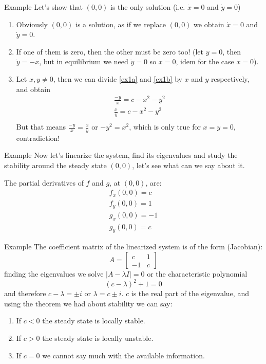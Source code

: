 \documentclass[aspectratio=169]{beamer}
\begin{document}
\begin{frame}{Example}
    Let's show that $(0,0)$ is the only solution (i.e. $\dot{x}=0$ and $\dot{y}=0$)
    \begin{enumerate}
        \item Obviously $(0,0)$ is a solution, as if we replace $(0,0)$ we obtain $\dot{x}=0$ and $\dot{y}=0$.
        \item If one of them is zero, then the other must be zero too! (let $y=0$, then $\dot{y}=-x$, but in equilibrium we need $\dot{y}=0$ so $x=0$, idem for the case $x=0$).
        \item Let $x,y\neq0$, then we can divide \eqref{ex1a} and \eqref{ex1b} by $x$ and $y$ respectively, and obtain
        \begin{align*}
            \frac{-y}{x}=c-x^2-y^2\\
            \frac{x}{y}=c-x^2-y^2\\
        \end{align*}
        But that means $\frac{-y}{x}=\frac{x}{y}$ or $-y^2=x^2$, which is only true for $x=y=0$, contradiction!
    \end{enumerate}
\end{frame}
\begin{frame}{Example}
    Now let's linearize the system, find its eigenvalues and study the stability around the steady state $(0,0)$, let's see what can we say about it.
    
    \pause
    
    The partial derivatives of $f$ and $g$, at $(0,0)$, are:
    \begin{align*}
        f_x(0,0)=c\\
        f_y(0,0)=1\\
        g_x(0,0)=-1\\
        g_y(0,0)=c
    \end{align*}
    
\end{frame}

\begin{frame}{Example}
    The coefficient matrix of the linearized system is of the form (Jacobian): \[A=\begin{bmatrix}c&1\\-1&c\end{bmatrix}\] finding the eigenvalues we solve \(|A-\lambda I|=0\) or the characteristic polynomial \[(c-\lambda)^2+1=0\] and therefore $c-\lambda = \pm i$ or $\lambda = c\pm i$. $c$ is the real part of the eigenvalue, and using the theorem we had about stability we can say:
    \begin{enumerate}
        \item If $c<0$ the steady state is locally stable.
        \item If $c>0$ the steady state is locally unstable.
        \item If $c=0$ we cannot say much with the available information.
    \end{enumerate}
\end{frame}
\end{document}
